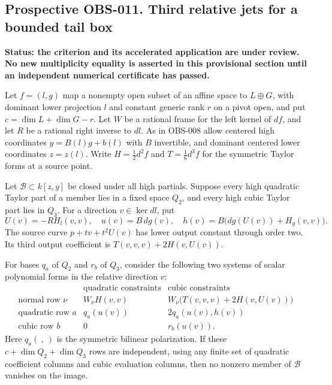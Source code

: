 \subsection*{Prospective OBS-011. Third relative jets for a bounded tail box}
\textbf{Status: the criterion and its accelerated application are under
review. No new multiplicity equality is asserted in this provisional
section until an independent numerical certificate has passed.}

Let $f=(l,g)$ map a nonempty open subset of an affine space to
$L\oplus G$, with dominant lower projection $l$ and constant generic
rank $r$ on a pivot open, and put $c=\dim L+\dim G-r$.
Let $W$ be a rational frame for the left
kernel of $df$, and let $R$ be a rational right inverse to $dl$.
As in OBS-008 allow centered high coordinates $y=B(l)g+b(l)$ with
$B$ invertible, and dominant centered lower coordinates $z=z(l)$.
Write $H=\tfrac12d^2f$ and $T=\tfrac16d^3f$ for the symmetric
Taylor forms at a source point.

Let $\mathcal B\subset k[z,y]$ be closed under all high partials.
Suppose every high quadratic Taylor part of a member lies in a
fixed space $Q_2$, and every high cubic Taylor part lies in $Q_3$.
For a direction $v\in\ker dl$, put
\[
 U(v)=-R H_l(v,v),\quad
 u(v)=B\,dg(v),\quad
 h(v)=B\bigl(dg(U(v))+H_g(v,v)\bigr).
\]
The source curve $p+t v+t^2U(v)$ has lower output constant through
order two. Its third output coefficient is
$T(v,v,v)+2H(v,U(v))$.

For bases $q_a$ of $Q_2$ and $r_b$ of $Q_3$, consider the following
two systems of scalar polynomial forms in the relative direction $v$:
\[
\begin{array}{c|cc}
 &\text{quadratic constraints}&\text{cubic constraints}\\\hline
\text{normal row }\nu&W_\nu H(v,v)&
 W_\nu\bigl(T(v,v,v)+2H(v,U(v))\bigr)\\
\text{quadratic row }a&q_a(u(v))&2q_a(u(v),h(v))\\
\text{cubic row }b&0&r_b(u(v)).
\end{array}                                                    \tag{TR-1}
\]
Here $q_a(\ ,\ )$ is the symmetric bilinear polarization. If these
$c+\dim Q_2+\dim Q_3$ rows are independent, using
any finite set of quadratic coefficient columns and cubic evaluation
columns, then no nonzero member of $\mathcal B$ vanishes on the image.

